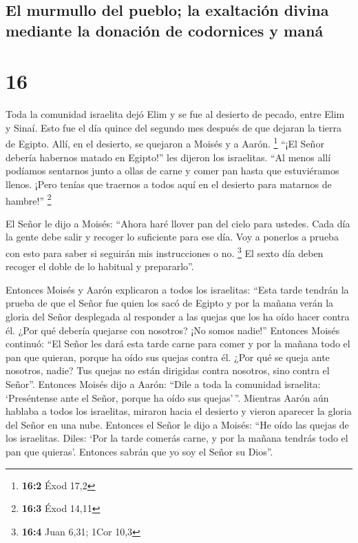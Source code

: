 \hypertarget{el-murmullo-del-pueblo-la-exaltaciuxf3n-divina-mediante-la-donaciuxf3n-de-codornices-y-manuxe1}{%
\subsection{El murmullo del pueblo; la exaltación divina mediante la
donación de codornices y
maná}\label{el-murmullo-del-pueblo-la-exaltaciuxf3n-divina-mediante-la-donaciuxf3n-de-codornices-y-manuxe1}}

\hypertarget{section-15}{%
\section{16}\label{section-15}}

 Toda la comunidad israelita dejó Elim y se fue al
desierto de pecado, entre Elim y Sinaí. Esto fue el día quince del
segundo mes después de que dejaran la tierra de Egipto. 
Allí, en el desierto, se quejaron a Moisés y a Aarón. \footnote{\textbf{16:2}
  Éxod 17,2}  ``¡El Señor debería habernos matado en
Egipto!'' les dijeron los israelitas. ``Al menos allí podíamos sentarnos
junto a ollas de carne y comer pan hasta que estuviéramos llenos. ¡Pero
tenías que traernos a todos aquí en el desierto para matarnos de
hambre!'' \footnote{\textbf{16:3} Éxod 14,11}

 El Señor le dijo a Moisés: ``Ahora haré llover pan del
cielo para ustedes. Cada día la gente debe salir y recoger lo suficiente
para ese día. Voy a ponerlos a prueba con esto para saber si seguirán
mis instrucciones o no. \footnote{\textbf{16:4} Juan 6,31; 1Cor 10,3}
 El sexto día deben recoger el doble de lo habitual y
prepararlo''.

 Entonces Moisés y Aarón explicaron a todos los
israelitas: ``Esta tarde tendrán la prueba de que el Señor fue quien los
sacó de Egipto  y por la mañana verán la gloria del Señor
desplegada al responder a las quejas que los ha oído hacer contra él.
¿Por qué debería quejarse con nosotros? ¡No somos nadie!''
 Entonces Moisés continuó: ``El Señor les dará esta tarde
carne para comer y por la mañana todo el pan que quieran, porque ha oído
sus quejas contra él. ¿Por qué se queja ante nosotros, nadie? Tus quejas
no están dirigidas contra nosotros, sino contra el Señor''.
 Entonces Moisés dijo a Aarón: ``Dile a toda la comunidad
israelita: `Preséntense ante el Señor, porque ha oído sus quejas'\,''.
 Mientras Aarón aún hablaba a todos los israelitas,
miraron hacia el desierto y vieron aparecer la gloria del Señor en una
nube.  Entonces el Señor le dijo a Moisés:
 ``He oído las quejas de los israelitas. Diles: `Por la
tarde comerás carne, y por la mañana tendrás todo el pan que quieras'.
Entonces sabrán que yo soy el Señor su Dios''.

